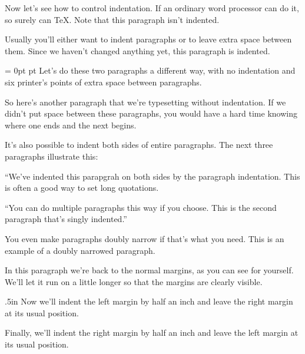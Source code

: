 \def\xmpheader #1/#2{\leftline{\xmplbx Example #1:\quad\xmplbxti #2}\baselineskip}
\xmpheader 2/{Indentation}
\noindent Now let's see how to control indentation.  If an ordinary word processor can do it, so
surely can \TeX.  Note that this paragraph isn't indented.

Usually you'll either want to indent paragraphs or to leave extra space between them.  Since we
haven't changed anything yet, this paragraph is indented.

{\parindent = 0pt  pt %
Let's do these two paragraphs a different way, with no indentation and six printer's points of
extra space between paragraphs.

So here's another paragraph that we're typesetting without indentation.  If we didn't put space
between these paragraphs, you would have a hard time knowing where one ends 
and the next begins.\par %
}%

It's also possible to indent both sides of entire paragraphs.  The
next three paragraphs illustrate this:
\smallskip %
{\narrower
``We've indented this parapgrah on both sides by the paragraph indentation.
This is often a good way to set long quotations.

``You can do multiple paragraphs this way if you choose.  This is the second
paragraph that's singly indented.''\par}

{\narrower \narrower You even make paragraphs doubly narrow if that's
what you need.  This is an example of a doubly narrowed paragraph.\par}
\vskip 1pc %
In this paragraph we're back to the normal margins, as you can see for yourself.  We'll let it run
on a little longer so that the margins are clearly visible. 

{\leftskip .5in Now we'll indent the left margin by half an inch and leave
the right margin at its usual position.\par}
{\rightskip 0.5in Finally, we'll indent the right margin by half an inch
and leave the left margin at its usual position.\par}
